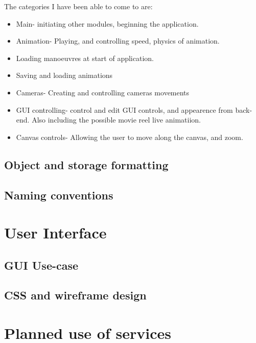 The categories I have been able to come to are:
\begin{itemize}
  \item Main- initiating other modules, beginning the application.
  \item Animation- Playing, and controlling speed, physics of animation.
  \item Loading manoeuvres at start of application.
  \item Saving and loading animations
  \item Cameras- Creating and controlling cameras movements
  \item GUI controlling- control and edit GUI controls, and appearence from back-end. Also including the possible movie reel live animatiion.
  \item Canvas controls- Allowing the user to move along the canvas, and zoom.
\end{itemize}

\subsection{Object and storage formatting}

\subsection{Naming conventions}

\section{User Interface}

\subsection{GUI Use-case}

\subsection{CSS and wireframe design}

\section{Planned use of services}

